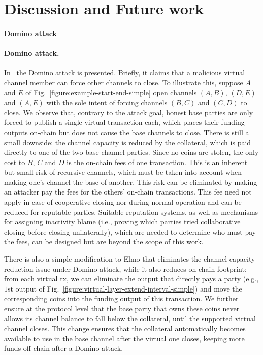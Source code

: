 \section{Discussion and Future work}
\label{sec:future-work}
\makeatletter%
%
  {\paragraph{Domino attack}}%
  {\paragraph{Domino attack.}}%
\makeatother%
In~\cite{donner} the Domino attack is presented. Briefly, it claims that a
malicious virtual channel member can force other channels to close. To
illustrate this, suppose $A$ and $E$ of
Fig.~\ref{figure:example-start-end-simple} open
channels
$(A, B)$, $(D, E)$ and $(A, E)$ with the sole intent of forcing channels $(B,
C)$ and $(C, D)$ to close. We observe that, contrary to the attack goal, honest
base parties are only
forced to publish a single virtual transaction each, which places their funding
outputs on-chain but does not cause the base channels to close. There is still a
small downside:
the channel capacity is reduced by the collateral, which
is paid directly to one of the two base channel parties. Since no coins are
stolen, the only cost to $B$, $C$ and $D$ is the on-chain fees
of one transaction. This is an inherent but small risk of
recursive channels, which must be taken into account when making one's
channel the base of another. This risk can be eliminated by making an attacker
pay the fees for the others' on-chain transactions. This fee need not apply in
case of cooperative closing nor
during normal operation and can be reduced for reputable parties.
Suitable reputation systems, as well as mechanisms for assigning inactivity
blame (i.e., proving which parties tried collaborative closing before
closing unilaterally), which are needed to determine who must pay the fees,
can be designed but are beyond the scope of this work.

There is also a simple modification to Elmo that eliminates the channel capacity reduction issue under Domino attack, while it also reduces on-chain
footprint: from each virtual tx, we can
eliminate the output that directly
pays a party (e.g., $1$st output of
Fig.~\ref{figure:virtual-layer-extend-interval-simple}) and move the
corresponding coins into the funding output of this transaction. We further
ensure at the protocol level that the base party that owns these coins never
allows its channel balance to fall below the collateral, until the supported
virtual channel closes. This change ensures that the collateral
automatically becomes available to use in the base channel after the virtual one
closes, keeping more funds off-chain after a Domino attack.

